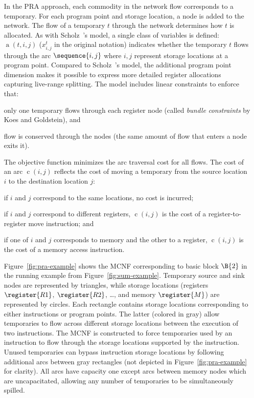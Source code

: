 \documentclass[acmsmall,authorversion,nonacm]{acmart}
\newcommand{\noMathVar}[2]{\operatorname{#1}(#2)}
\newcommand{\var}[2]{$\noMathVar{#1}{#2}$}
\begin{document}
In the PRA approach, each commodity in the network flow corresponds to
a temporary.
For each program point and storage location, a node is added to the
network.
The flow of a temporary $t$ through the network determines how $t$ is
allocated.
As with Scholz~\etal{}'s model, a single class of variables is
defined:
\var{a}{t,i,j} ($x^{t}_{i,j}$ in the original notation) indicates
whether the temporary $t$ flows through the arc $\sequence{i,j}$ where
$i,j$ represent storage locations at a program point.
Compared to Scholz~\etal{}'s model, the additional program point
dimension makes it possible to express more detailed register
allocations capturing live-range splitting.
The model includes linear constraints to enforce that:
\begin{inparaitem}[]
\item only one temporary flows through each register node (called
  \emph{bundle constraints} by Koes and Goldstein),
  and
\item flow is conserved through the nodes (the same amount of flow
  that enters a node exits it).
\end{inparaitem}
The objective function minimizes the arc traversal cost for all
flows.
The cost of an arc \var{c}{i,j} reflects the cost of moving a
temporary from the source location $i$ to the destination location
$j$:
\begin{inparaitem}[]
\item if $i$ and $j$ correspond to the same locations, no cost is
  incurred;
\item if $i$ and $j$ correspond to different registers, \var{c}{i,j}
  is the cost of a register-to-register move instruction; and
\item if one of $i$ and $j$ corresponds to memory and the other to a
  register, \var{c}{i,j} is the cost of a memory access instruction.
\end{inparaitem}

Figure~\ref{fig:pra-example} shows the MCNF corresponding to basic
block $\B{2}$ in the running example from
Figure~\ref{fig:sum-example}.
Temporary source and sink nodes are represented by triangles, while
storage locations (registers~$\register{R1}$, $\register{R2}$, \ldots,
and memory $\register{M}$) are represented by circles.
Each rectangle contains storage locations corresponding to either
instructions or program points.
The latter (colored in gray) allow temporaries to flow across
different storage locations between the execution of two instructions.
The MCNF is constructed to force temporaries used by an instruction to
flow through the storage locations supported by the instruction.
Unused temporaries can bypass instruction storage locations by
following additional arcs between gray rectangles (not depicted in
Figure~\ref{fig:pra-example} for clarity).
All arcs have capacity one except arcs between memory nodes which are
uncapacitated, allowing any number of temporaries to be simultaneously
spilled.
\end{document}
